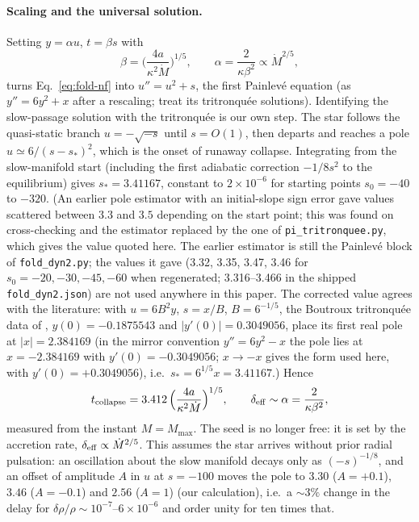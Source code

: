 \documentclass[11pt]{article}
\begin{document}
\paragraph{Scaling and the universal solution.} Setting $y=\alpha u$, $t=\beta s$ with
\begin{equation}
\beta=\Big(\frac{4a}{\kappa^2\dot M}\Big)^{1/5},\qquad \alpha=\frac{2}{\kappa\beta^2}\propto\dot M^{2/5},
\end{equation}
turns Eq.~\eqref{eq:fold-nf} into $u''=u^2+s$, the first Painlev\'e equation (as $y''=6y^2+x$ after a rescaling; \citealt{JoshiKitaev2001} treat its tritronqu\'ee solutions). Identifying the slow-passage solution with the tritronqu\'ee is our own step. The star follows the quasi-static branch $u=-\sqrt{-s}$ until $s=O(1)$, then departs and reaches a pole $u\simeq6/(s-s_*)^2$, which is the onset of runaway collapse. Integrating from the slow-manifold start (including the first adiabatic correction $-1/8s^2$ to the equilibrium) gives
$s_*=3.41167$, constant to $2\times10^{-6}$ for starting points $s_0=-40$ to $-320$. (An earlier pole estimator with an initial-slope sign error gave values scattered between $3.3$ and $3.5$ depending on the start point; this was found on cross-checking and the estimator replaced by the one of \texttt{pi\_tritronquee.py}, which gives the value quoted here. The earlier estimator is still the Painlev\'e block of \texttt{fold\_dyn2.py}; the values it gave (3.32, 3.35, 3.47, 3.46 for $s_0=-20,-30,-45,-60$ when regenerated; 3.316--3.466 in the shipped \texttt{fold\_dyn2.json}) are not used anywhere in this paper. The corrected value agrees with the literature: with $u=6B^2y$, $s=x/B$, $B=6^{-1/5}$, the Boutroux tritronqu\'ee data of \citet{JoshiKitaev2001}, $y(0)=-0.1875543$ and $|y'(0)|=0.3049056$, place its first real pole at $|x|=2.384169$ (in the mirror convention $y''=6y^2-x$ the pole lies at $x=-2.384169$ with $y'(0)=-0.3049056$; $x\to-x$ gives the form used here, with $y'(0)=+0.3049056$), i.e.\ $s_*=6^{1/5}x=3.41167$.) Hence
\begin{equation}
t_{\rm collapse}=3.412\,\Big(\frac{4a}{\kappa^2\dot M}\Big)^{1/5},\qquad
\delta_{\rm eff}\sim\alpha=\frac{2}{\kappa\beta^2},
\end{equation}
measured from the instant $M=M_{\max}$. The seed is no longer free: it is set by the accretion rate, $\delta_{\rm eff}\propto\dot M^{2/5}$. This assumes the star arrives without prior radial pulsation: an oscillation about the slow manifold decays only as $(-s)^{-1/8}$, and an offset of amplitude $A$ in $u$ at $s=-100$ moves the pole to $3.30$ ($A=+0.1$), $3.46$ ($A=-0.1$) and $2.56$ ($A=1$) (our calculation), i.e.\ a $\sim3\%$ change in the delay for $\delta\rho/\rho\sim10^{-7}$--$6\times10^{-6}$ and order unity for ten times that.
\end{document}
